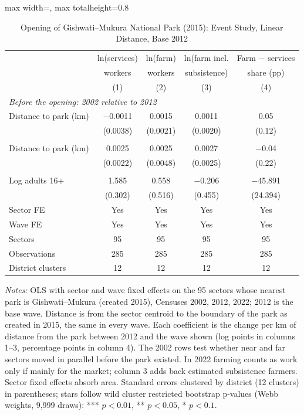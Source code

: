 \documentclass[11pt]{article}
\begin{document}
\begin{table}[H]
\centering\footnotesize\setlength{\tabcolsep}{4pt}
\caption{Opening of Gishwati--Mukura National Park (2015): Event Study, Linear Distance, Base 2012}
\label{tab:gm_linear_2012}
\begin{adjustbox}{max width=\textwidth, max totalheight=0.8\textheight}
\begin{tabular}{lcccc}
\toprule
 & ln(services) & ln(farm) & ln(farm incl. & Farm $-$ services \\
 & workers & workers & subsistence) & share (pp) \\
 & (1) & (2) & (3) & (4) \\
\midrule
\multicolumn{5}{l}{\textit{Before the opening: 2002 relative to 2012}} \\
\quad Distance to park (km) & $-$0.0011 & 0.0015 & 0.0011 & 0.05 \\
 & (0.0038) & (0.0021) & (0.0020) & (0.12) \\
\addlinespace
\multicolumn{5}{l}{\textit{After the opening: 2022 relative to 2012}} \\
\quad Distance to park (km) & 0.0025 & 0.0025 & 0.0027 & $-$0.04 \\
 & (0.0022) & (0.0048) & (0.0025) & (0.22) \\
\addlinespace
\multicolumn{5}{l}{\textit{Controls}} \\
\quad Log adults 16+ & 1.585 & 0.558 & $-$0.206 & $-$45.891 \\
 & (0.302) & (0.516) & (0.455) & (24.394) \\
\midrule
Sector FE & Yes & Yes & Yes & Yes \\
Wave FE & Yes & Yes & Yes & Yes \\
Sectors & 95 & 95 & 95 & 95 \\
Observations & 285 & 285 & 285 & 285 \\
District clusters & 12 & 12 & 12 & 12 \\
\bottomrule
\end{tabular}
\end{adjustbox}
\begin{minipage}{0.97\textwidth}\scriptsize
\textit{Notes:} OLS with sector and wave fixed effects on the 95 sectors whose nearest park is Gishwati--Mukura (created 2015), Censuses 2002, 2012, 2022; 2012 is the base wave. Distance is from the sector centroid to the boundary of the park as created in 2015, the same in every wave. Each coefficient is the change per km of distance from the park between 2012 and the wave shown (log points in columns 1--3, percentage points in column 4). The 2002 rows test whether near and far sectors moved in parallel before the park existed. In 2022 farming counts as work only if mainly for the market; column 3 adds back estimated subsistence farmers. Sector fixed effects absorb area. Standard errors clustered by district (12 clusters) in parentheses; stars follow wild cluster restricted bootstrap p-values (Webb weights, 9,999 draws): *** $p<0.01$, ** $p<0.05$, * $p<0.1$.
\end{minipage}
\end{table}
\end{document}
